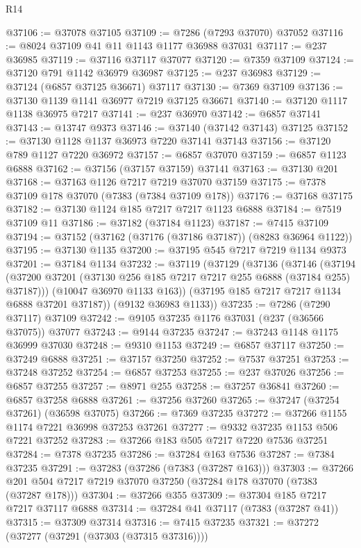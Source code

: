 \begin{lexlean}{R14}
\begin{coremodule}
@37106 := @37078 @37105
@37109 := @7286 (@7293 @37070) @37052
@37116 := @8024 @37109 @41 @11 @1143 @1177 @36988 @37031
@37117 := @237 @36985
@37119 := @37116 @37117 @37077
@37120 := @7359 @37109
@37124 := @37120 @791 @1142 @36979 @36987
@37125 := @237 @36983
@37129 := @37124 (@6857 @37125 @36671) @37117
@37130 := @7369 @37109
@37136 := @37130 @1139 @1141 @36977 @7219 @37125 @36671
@37140 := @37120 @1117 @1138 @36975 @7217
@37141 := @237 @36970
@37142 := @6857 @37141
@37143 := @13747 @9373
@37146 := @37140 (@37142 @37143) @37125
@37152 := @37130 @1128 @1137 @36973 @7220 @37141 @37143
@37156 := @37120 @789 @1127 @7220 @36972
@37157 := @6857 @37070
@37159 := @6857 @1123 @6888
@37162 := @37156 (@37157 @37159) @37141
@37163 := @37130 @201
@37168 := @37163 @1126 @7217 @7219 @37070 @37159
@37175 := @7378 @37109 @178 @37070 (@7383 (@7384 @37109 @178))
@37176 := @37168 @37175
@37182 := @37130 @1124 @185 @7217 @7217 @1123 @6888
@37184 := @7519 @37109 @11
@37186 := @37182 (@37184 @1123)
@37187 := @7415 @37109
@37194 := @37152 (@37162 (@37176 (@37186 @37187)) (@8283 @36964 @1122))
@37195 := @37130 @1135
@37200 := @37195 @545 @7217 @7219 @1134 @9373
@37201 := @37184 @1134
@37232 := @37119
    (@37129
      (@37136
        (@37146
          (@37194 (@37200 @37201 (@37130 @256 @185 @7217 @7217 @255 @6888 (@37184 @255) @37187)))
          (@10047 @36970 @1133 @163))
        (@37195 @185 @7217 @7217 @1134 @6888 @37201 @37187))
      (@9132 @36983 @1133))
@37235 := @7286 (@7290 @37117) @37109
@37242 := @9105 @37235 @1176 @37031 (@237 (@36566 @37075)) @37077
@37243 := @9144 @37235
@37247 := @37243 @1148 @1175 @36999 @37030
@37248 := @9310 @1153
@37249 := @6857 @37117
@37250 := @37249 @6888
@37251 := @37157 @37250
@37252 := @7537 @37251
@37253 := @37248 @37252
@37254 := @6857 @37253
@37255 := @237 @37026
@37256 := @6857 @37255
@37257 := @8971 @255
@37258 := @37257 @36841
@37260 := @6857 @37258 @6888
@37261 := @37256 @37260
@37265 := @37247 (@37254 @37261) (@36598 @37075)
@37266 := @7369 @37235
@37272 := @37266 @1155 @1174 @7221 @36998 @37253 @37261
@37277 := @9332 @37235 @1153 @506 @7221 @37252
@37283 := @37266 @183 @505 @7217 @7220 @7536 @37251
@37284 := @7378 @37235
@37286 := @37284 @163 @7536
@37287 := @7384 @37235
@37291 := @37283 (@37286 (@7383 (@37287 @163)))
@37303 := @37266 @201 @504 @7217 @7219 @37070 @37250 (@37284 @178 @37070 (@7383 (@37287 @178)))
@37304 := @37266 @355
@37309 := @37304 @185 @7217 @7217 @37117 @6888
@37314 := @37284 @41 @37117 (@7383 (@37287 @41))
@37315 := @37309 @37314
@37316 := @7415 @37235
@37321 := @37272 (@37277 (@37291 (@37303 (@37315 @37316))))

\end{coremodule}
\end{lexlean}
